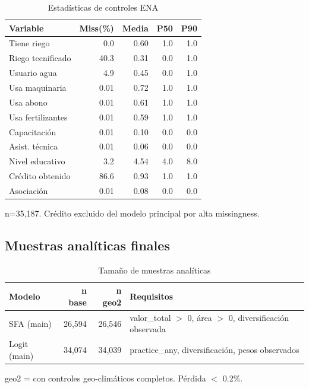 \documentclass[11pt,a4paper]{article}
\begin{document}
\begin{table}[H]
\centering
\caption{Estadísticas de controles ENA}
\label{tab:ena_controls_overall}
\begin{threeparttable}
\small
\begin{tabular}{lrrrr}
\toprule
\textbf{Variable} & \textbf{Miss(\%)} & \textbf{Media} & \textbf{P50} & \textbf{P90} \\
\midrule
Tiene riego & 0.0 & 0.60 & 1.0 & 1.0 \\
Riego tecnificado & 40.3 & 0.31 & 0.0 & 1.0 \\
Usuario agua & 4.9 & 0.45 & 0.0 & 1.0 \\
Usa maquinaria & 0.01 & 0.72 & 1.0 & 1.0 \\
Usa abono & 0.01 & 0.61 & 1.0 & 1.0 \\
Usa fertilizantes & 0.01 & 0.59 & 1.0 & 1.0 \\
Capacitación & 0.01 & 0.10 & 0.0 & 0.0 \\
Asist. técnica & 0.01 & 0.06 & 0.0 & 0.0 \\
Nivel educativo & 3.2 & 4.54 & 4.0 & 8.0 \\
Crédito obtenido & 86.6 & 0.93 & 1.0 & 1.0 \\
Asociación & 0.01 & 0.08 & 0.0 & 0.0 \\
\bottomrule
\end{tabular}
\begin{tablenotes}
\footnotesize
\item n=35,187. Crédito excluido del modelo principal por alta missingness.
\end{tablenotes}
\end{threeparttable}
\end{table}

\subsection{Muestras analíticas finales}

\begin{table}[H]
\centering
\caption{Tamaño de muestras analíticas}
\label{tab:sample_analytical}
\begin{threeparttable}
\small
\begin{tabular}{lrrp{7cm}}
\toprule
\textbf{Modelo} & \textbf{n base} & \textbf{n geo2} & \textbf{Requisitos} \\
\midrule
SFA (main) & 26,594 & 26,546 & valor\_total $>$ 0, área $>$ 0, diversificación observada \\
Logit (main) & 34,074 & 34,039 & practice\_any, diversificación, pesos observados \\
\bottomrule
\end{tabular}
\begin{tablenotes}
\footnotesize
\item geo2 = con controles geo-climáticos completos. Pérdida $<$ 0.2\%.
\end{tablenotes}
\end{threeparttable}
\end{table}
\end{document}
